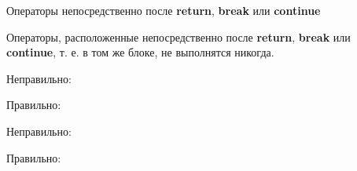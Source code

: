 \begin{typerror}
	\label{TE_operators-after-delete-break-continue}
	Операторы непосредственно после \textbf{return}, \textbf{break} или \textbf{continue}

	Операторы, расположенные непосредственно после \textbf{return}, \textbf{break} или \textbf{continue}, т. е. в том же блоке, не выполнятся никогда.

	Неправильно:

	Правильно:

	Неправильно:

	Правильно:

\end  {typerror}
